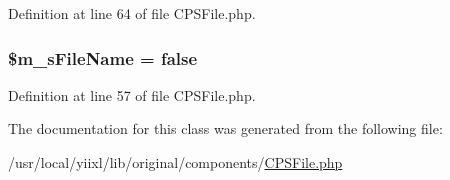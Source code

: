 Definition at line 64 of file CPSFile.php.

\hypertarget{classCPSFile_a72ce389198502eabc1a52fb24abd8685}{
\subsubsection[{\$m\_\-sFileName}]{\setlength{\rightskip}{0pt plus 5cm}\$m\_\-sFileName = false}}
\label{classCPSFile_a72ce389198502eabc1a52fb24abd8685}


Definition at line 57 of file CPSFile.php.



The documentation for this class was generated from the following file:\begin{DoxyCompactItemize}
\item 
/usr/local/yiixl/lib/original/components/\hyperlink{CPSFile_8php}{CPSFile.php}\end{DoxyCompactItemize}
